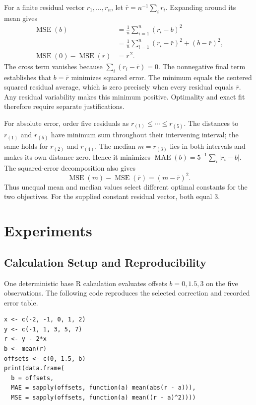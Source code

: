 \documentclass[11pt]{article}
\begin{document}
For a finite residual vector \(r_1,\ldots,r_n\), let
\(\bar r=n^{-1}\sum_i r_i\). Expanding around its mean gives
\begin{align*}
\operatorname{MSE}(b)
&=\frac{1}{n}\sum_{i=1}^{n}(r_i-b)^2\\
&=\frac{1}{n}\sum_{i=1}^{n}(r_i-\bar r)^2
  +(b-\bar r)^2,\\
\operatorname{MSE}(0)-\operatorname{MSE}(\bar r)
&=\bar r^{\,2}.
\end{align*}
The cross term vanishes because \(\sum_i(r_i-\bar r)=0\).
The nonnegative final term establishes that \(b=\bar r\) minimizes
squared error. The minimum equals the centered squared residual
average, which is zero precisely when every residual equals \(\bar r\).
Any residual variability makes this minimum positive. Optimality
and exact fit therefore require separate justifications.

For absolute error, order five residuals as
\(r_{(1)}\leq\cdots\leq r_{(5)}\).
The distances to \(r_{(1)}\) and \(r_{(5)}\) have minimum sum
throughout their intervening interval; the same holds for
\(r_{(2)}\) and \(r_{(4)}\).
The median \(m=r_{(3)}\) lies in both intervals and makes its own
distance zero. Hence it minimizes
\(\operatorname{MAE}(b)=5^{-1}\sum_i|r_i-b|\).
The squared-error decomposition also gives
\[
\operatorname{MSE}(m)-\operatorname{MSE}(\bar r)
=(m-\bar r)^2.
\]
Thus unequal mean and median values select different optimal
constants for the two objectives. For the supplied constant
residual vector, both equal \(3\).

\section{Experiments}

\subsection{Calculation Setup and Reproducibility}

One deterministic base R calculation evaluates offsets \(b=0,1.5,3\)
on the five observations. The following code reproduces the selected
correction and recorded error table.

\begingroup
\small
\begin{verbatim}
x <- c(-2, -1, 0, 1, 2)
y <- c(-1, 1, 3, 5, 7)
r <- y - 2*x
b <- mean(r)
offsets <- c(0, 1.5, b)
print(data.frame(
  b = offsets,
  MAE = sapply(offsets, function(a) mean(abs(r - a))),
  MSE = sapply(offsets, function(a) mean((r - a)^2))))
\end{verbatim}
\endgroup
\end{document}
